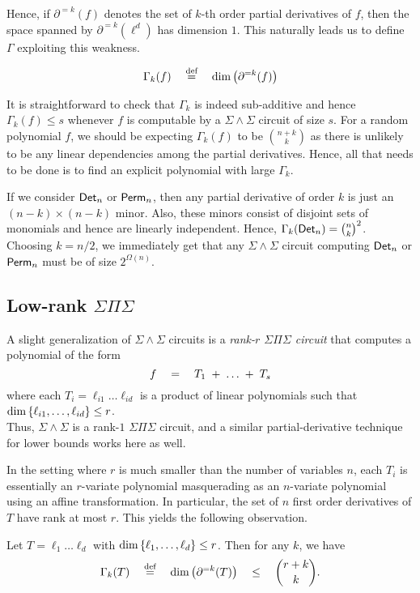 Hence, if $\partial^{=k}(f)$ denotes the set of $k$-th order partial derivatives of $f$, then the space spanned by $\partial^{=k}(\ell^d)$ has dimension $1$. This naturally leads us to define $\Gamma$ exploiting this weakness. 

$$
\Gamma_k(f)\quad \stackrel{\text{def}}{=} \quad \dim \left(\partial^{=k}(f)\right)
$$

It is straightforward to check that $\Gamma_k$ is indeed sub-additive and hence $\Gamma_k(f) \leq s$ whenever $f$ is computable by a $\Sigma\!\wedge\!\Sigma$ circuit of size $s$. For a random polynomial $f$, we should be expecting $\Gamma_k(f)$ to be $\binom{n+k}{k}$ as there is unlikely to be any linear dependencies among the partial derivatives. Hence, all that needs to be done is to find an explicit polynomial with large $\Gamma_k$. 


If we consider $\mathsf{Det}_n$ or $\mathsf{Perm}_n$, then any partial derivative of order $k$ is just an $(n-k)\times(n-k)$ minor. Also, these minors consist of disjoint sets of monomials and hence are linearly independent. Hence, $\Gamma_k(\mathsf{Det}_n) = \binom{n}{k}^2$. Choosing $k = n/2$, we immediately get that any $\Sigma\!\wedge\!\Sigma$ circuit computing $\mathsf{Det}_n$ or $\mathsf{Perm}_n$ must be of size $2^{\Omega(n)}$. \\

\subsection{Low-rank $\Sigma\Pi\Sigma$}\label{sec:low-rank-sps}

A slight generalization of $\Sigma\!\wedge\!\Sigma$ circuits is a \emph{rank-$r$ $\Sigma\Pi\Sigma$ circuit} that computes a polynomial of the form 
$$
f \quad = \quad  T_1 \;+\; \dots \;+\; T_s
$$
where each $T_i = \ell_{i1}\dots \ell_{id}$ is a product of linear polynomials such that $\dim\left\{\ell_{i1},\dots, \ell_{id}\right\}\leq r$. \\

Thus, $\Sigma\!\wedge\!\Sigma$  is a rank-$1$ $\Sigma\Pi\Sigma$ circuit, and a similar partial-derivative technique for lower bounds works here as well. 

In the setting where $r$ is much smaller than the number of variables $n$, each $T_i$ is essentially an $r$-variate polynomial masquerading as an $n$-variate polynomial using an affine transformation. In particular, the set of $n$ first order derivatives of $T$ have rank at most $r$. This yields the following observation.

\begin{observation}
Let $T = \ell_1\dots \ell_d$ with $\dim\left\{\ell_1,\dots, \ell_d\right\}\leq r$. Then for any $k$, we have
$$
\Gamma_k(T) \quad \stackrel{\text{def}}{=} \quad\dim\left(\partial^{=k}(T)\right) \quad \leq \quad \binom{r+k}{k}.
$$
\end{observation}

